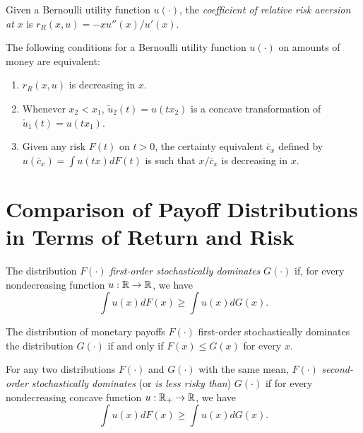 \begin{defn}
    Given a Bernoulli utility function $u(\cdot)$, the \emph{coefficient of relative risk aversion at} $x$ is $r_R(x, u) = -x u''(x) / u'(x)$.
\end{defn}

\begin{prop}
    The following conditions for a Bernoulli utility function $u(\cdot)$ on amounts of money are equivalent:
    \begin{enumerate}
        \item $r_R(x, u)$ is decreasing in $x$.
        \item Whenever $x_2 < x_1$, $\tilde{u}_2(t) = u(tx_2)$ is a concave transformation of $\tilde{u}_1(t) = u(tx_1)$.
        \item Given any risk $F(t)$ on $t > 0$, the certainty equivalent $\bar{c}_x$ defined by $u(\bar{c}_x) = \int u(tx) dF(t)$ is such that $x / \bar{c}_x$ is decreasing in $x$.
    \end{enumerate}
\end{prop}


\section{Comparison of Payoff Distributions in Terms of Return and Risk}

\begin{defn}
    The distribution $F(\cdot)$ \emph{first-order stochastically dominates} $G(\cdot)$ if, for every nondecreasing function $u : \mathbb{R} \rightarrow \mathbb{R}$, we have
    \begin{equation*}
        \int u(x) dF(x) \geq \int u(x) dG(x).
    \end{equation*}
\end{defn}

\begin{prop}
    The distribution of monetary payoffs $F(\cdot)$ first-order stochastically dominates the distribution $G(\cdot)$ if and only if $F(x) \leq G(x)$ for every $x$.
\end{prop}

\begin{defn}\label{pi.chvi.2-stoch-dom}
    For any two distributions $F(\cdot)$ and $G(\cdot)$ with the same mean, $F(\cdot)$ \emph{second-order stochastically dominates} (or \emph{is less risky than}) $G(\cdot)$ if for every nondecreasing concave function $u : \mathbb{R}_+ \rightarrow \mathbb{R}$, we have
    \begin{equation*}
        \int u(x) dF(x) \geq \int u(x) dG(x).
    \end{equation*}
\end{defn}


